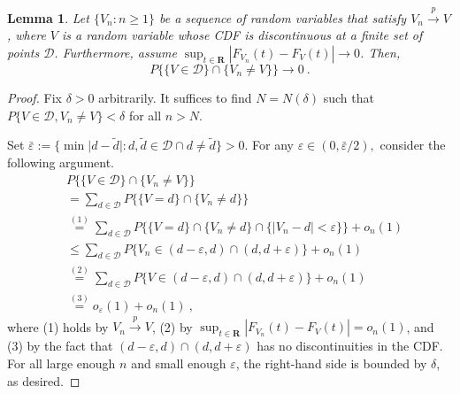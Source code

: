 \documentclass[11pt]{article}
\numberwithin{equation}{section}
\newtheorem{lemma}{Lemma}%
\begin{document}
\begin{lemma}\label{lemma:equal-value-at-limit} 
Let $\{V_{n}:n\ge 1\}$ be a sequence of random variables that satisfy $V_{n}\overset{p}{\to }V$, where $V$ is a random variable whose CDF is discontinuous at a finite set of points $\mathcal{D}$. Furthermore, assume $\sup_{t\in \mathbf{R}}|F_{V_{n}}(t)-F_{V}(t)|\to 0$. Then, 
\begin{equation*}
P\{\{V\in \mathcal{D}\} \cap \{V_{n}\neq V\}\}\to 0~.
\end{equation*}
\end{lemma}
\begin{proof}
Fix $\delta >0$ arbitrarily. It suffices to find $N=N(\delta) $
such that $P\{V\in \mathcal{D},V_{n}\neq V\}<\delta $ for all $n>N$.

Set $\bar{\varepsilon}:=\{ \min \vert d-\tilde{d}\vert :d, \tilde{d}\in \mathcal{D}\cap d\not=\tilde{d}\} >0$. For any $ \varepsilon \in (0,\bar{\varepsilon}/2),$ consider the following argument. 
\begin{align*}
&P\{\{V\in \mathcal{D}\} \cap \{V_{n}\neq V\}\} \\
&=\sum_{d\in \mathcal{D}}P\{\{V=d\} \cap \{V_{n}\neq d\} \} \\
& \overset{(1)}{=} \sum_{d\in \mathcal{D}}P\{\{V=d\} \cap \{V_{n}\neq d\} \cap \{|V_{n}-d|<\varepsilon\}\}+o_{n}(1) \\
& \leq \sum_{d\in \mathcal{D}}P\{V_{n}\in (d-\varepsilon ,d)\cap (d,d+\varepsilon )\}+o_{n}(1) \\
& \overset{(2)}{=} 
\sum_{d\in \mathcal{D}}P\{V \in (d-\varepsilon ,d)\cap (d,d+\varepsilon )\}+o_{n}(1) \\
& \overset{(3)}{=} o_{\varepsilon }(1)+o_{n}(1)~,
\end{align*}
where (1) holds by $V_{n}\overset{p}{\to }V$, (2) by $\sup_{t\in \mathbf{R}}|F_{V_{n}}(t)-F_{V}(t)|=o_{n}(1) $,
and (3) by the fact that $(d-\varepsilon ,d)\cap (d,d+\varepsilon )$ has no discontinuities in the CDF. 
For all large enough $n$ and small enough $\varepsilon $, the right-hand side is bounded by $\delta $, as desired.
\end{proof}
\end{document}
